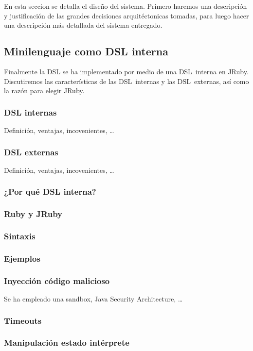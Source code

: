En esta seccion se detalla el diseño del sistema. Primero haremos una
descripción y justificación de las grandes decisiones arquitéctonicas
tomadas, para luego hacer una descripción más detallada del sistema
entregado.

\subsection{Minilenguaje como DSL interna}
Finalmente la DSL se ha implementado por medio de una DSL~interna en
JRuby. Discutiremos las características de las DSL~internas y las
DSL~externas, así como la razón para elegir JRuby.
\subsubsection{DSL internas}
Definición, ventajas, incovenientes, \ldots{}
\subsubsection{DSL externas}
Definición, ventajas, incovenientes, \ldots{}
\subsubsection{¿Por qué DSL interna?}
\subsubsection{Ruby y JRuby}
\subsubsection{Sintaxis}
\subsubsection{Ejemplos}

\subsubsection{Inyección código malicioso}
Se ha empleado una sandbox, Java Security Architecture, \ldots{}
\subsubsection{Timeouts}
\subsubsection{Manipulación estado intérprete}

